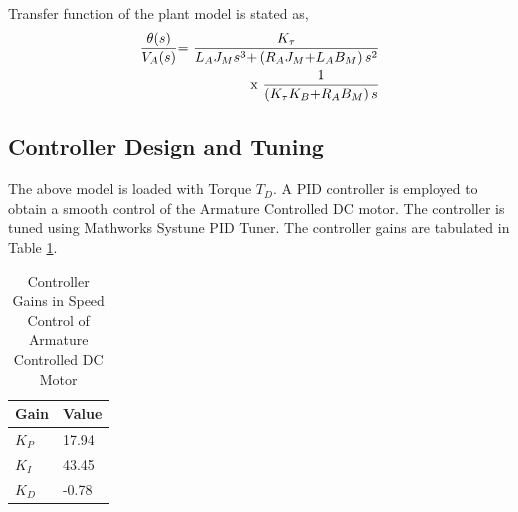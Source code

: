 Transfer function of the plant model is stated as,
\begin{align} 
\frac{\theta {\rm (}s{\rm )}}{V_A{\rm (}s{\rm )}}{\rm =\ } \frac{K_{\tau }}{L_AJ_Ms^{{\rm 3}}{\rm +}\left(R_AJ_M{\rm +}L_AB_M\right)s^{{\rm 2}}} \nonumber\\
{\rm x\ } \frac{1}{\left(K_{\tau }K_B{\rm +}R_AB_M\right)s}
\end{align}


\subsection{Controller Design and Tuning}

The above model is loaded with Torque $T_D$. A PID controller is employed to obtain a smooth control of the Armature Controlled DC motor. The controller is tuned using Mathworks Systune PID Tuner. The controller gains are tabulated in Table \ref{tab:ACDC_gain}.

\begin{table}[]
	\centering
	\caption{Controller Gains in Speed Control of Armature Controlled DC Motor}
	\label{tab:ACDC_gain}
	\begin{tabular}{ll}\\
		\hline
		Gain & Value \\ \hline
		$ K_P $ & 17.94 \\
		$ K_I $ & 43.45 \\
		$ K_D $ & -0.78 \\ \hline
	\end{tabular}
\end{table}


